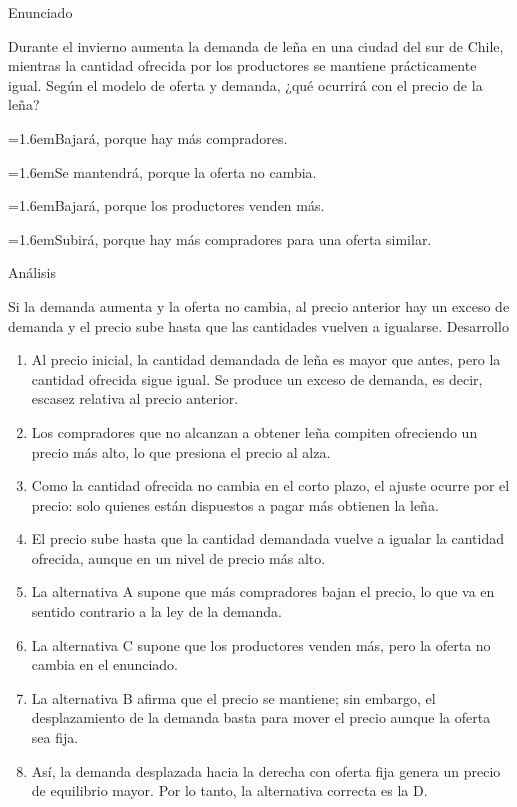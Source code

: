 \documentclass[10pt,a4paper,twocolumn]{article}
\newcommand{\alternativa}[2]{\par\noindent\hangindent=1.6em\hangafter=1\makebox[1.6em][l]{\tecla{#1}}#2\par}
\newcommand{\clave}[1]{\par\smallskip{\sffamily\footnotesize\color{esmeralda} Clave \teclaok{#1}}\par}
\begin{document}
\begin{ejemplo}
{\sffamily\footnotesize\color{zinc500} Enunciado}\par
Durante el invierno aumenta la demanda de leña en una ciudad del sur de Chile, mientras la cantidad ofrecida por los productores se mantiene prácticamente igual. Según el modelo de oferta y demanda, ¿qué ocurrirá con el precio de la leña?
\alternativa{A}{Bajará, porque hay más compradores.}
\alternativa{B}{Se mantendrá, porque la oferta no cambia.}
\alternativa{C}{Bajará, porque los productores venden más.}
\alternativa{D}{Subirá, porque hay más compradores para una oferta similar.}
\clave{D}
{\sffamily\footnotesize\color{zinc500} Análisis}\par Si la demanda aumenta y la oferta no cambia, al precio anterior hay un exceso de demanda y el precio sube hasta que las cantidades vuelven a igualarse.
{\sffamily\footnotesize\color{zinc500} Desarrollo}
\begin{enumerate}
  \item Al precio inicial, la cantidad demandada de leña es mayor que antes, pero la cantidad ofrecida sigue igual. Se produce un exceso de demanda, es decir, escasez relativa al precio anterior.
  \item Los compradores que no alcanzan a obtener leña compiten ofreciendo un precio más alto, lo que presiona el precio al alza.
  \item Como la cantidad ofrecida no cambia en el corto plazo, el ajuste ocurre por el precio: solo quienes están dispuestos a pagar más obtienen la leña.
  \item El precio sube hasta que la cantidad demandada vuelve a igualar la cantidad ofrecida, aunque en un nivel de precio más alto.
  \item La alternativa A supone que más compradores bajan el precio, lo que va en sentido contrario a la ley de la demanda.
  \item La alternativa C supone que los productores venden más, pero la oferta no cambia en el enunciado.
  \item La alternativa B afirma que el precio se mantiene; sin embargo, el desplazamiento de la demanda basta para mover el precio aunque la oferta sea fija.
  \item Así, la demanda desplazada hacia la derecha con oferta fija genera un precio de equilibrio mayor. Por lo tanto, la alternativa correcta es la D.
\end{enumerate}
\end{ejemplo}
\end{document}
